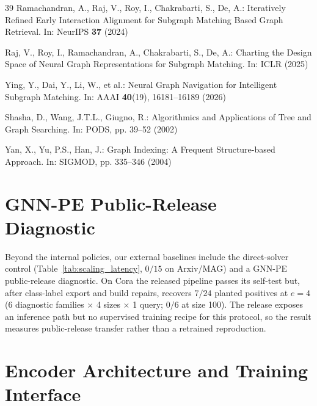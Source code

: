 \documentclass{article}
\begin{document}
{\begin{thebibliography}{39}
Ramachandran, A., Raj, V., Roy, I., Chakrabarti, S., De, A.: Iteratively Refined Early Interaction Alignment for Subgraph Matching Based Graph Retrieval. In: NeurIPS \textbf{37} (2024)

Raj, V., Roy, I., Ramachandran, A., Chakrabarti, S., De, A.: Charting the Design Space of Neural Graph Representations for Subgraph Matching. In: ICLR (2025)

Ying, Y., Dai, Y., Li, W., et al.: Neural Graph Navigation for Intelligent Subgraph Matching. In: AAAI \textbf{40}(19), 16181--16189 (2026)

Shasha, D., Wang, J.T.L., Giugno, R.: Algorithmics and Applications of Tree and Graph Searching. In: PODS, pp. 39--52 (2002)

Yan, X., Yu, P.S., Han, J.: Graph Indexing: A Frequent Structure-based Approach. In: SIGMOD, pp. 335--346 (2004)

\end{thebibliography}
}

\clearpage
\appendix


\section{GNN-PE Public-Release Diagnostic}
\label{app:gnnpe}

Beyond the internal policies, our external baselines include the direct-solver control (Table~\ref{tab:scaling_latency}, $0/15$ on Arxiv/MAG) and a GNN-PE public-release diagnostic. On Cora the released pipeline passes its self-test but, after class-label export and build repairs, recovers $7/24$ planted positives at $e=4$ (6 diagnostic families $\times$ 4 sizes $\times$ 1 query; $0/6$ at size 100). The release exposes an inference path but no supervised training recipe for this protocol, so the result measures public-release transfer rather than a retrained reproduction.

\section{Encoder Architecture and Training Interface}
\label{app:encoder}
\end{document}
